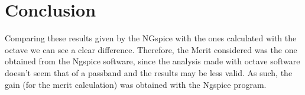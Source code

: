 \section{Conclusion}
\label{sec:conclusion}

Comparing these results given by the NGspice with the ones calculated with the octave we can see a clear difference. Therefore, the Merit considered was the one obtained from the Ngspice software, since the analysis made with octave software doesn't seem that of a passband and the results may be less valid. As such, the gain (for the merit calculation) was obtained with the Ngspice program.
